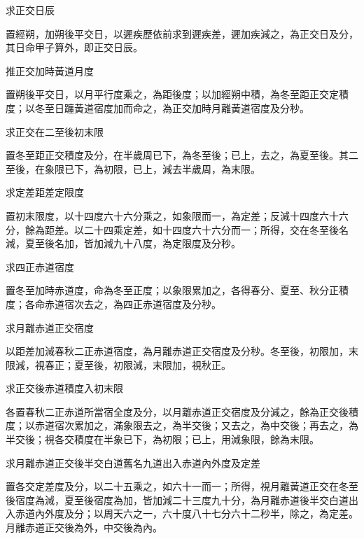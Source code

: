 \begin{pinyinscope}
 求正交日辰



 置經朔，加朔後平交日，以遲疾歷依前求到遲疾差，遲加疾減之，為正交日及分，其日命甲子算外，即正交日辰。



 推正交加時黃道月度



 置朔後平交日，以月平行度乘之，為距後度；以加經朔中積，為冬至距正交定積度；以冬至日躔黃道宿度加而命之，為正交加時月離黃道宿度及分秒。



 求正交在二至後初末限



 置冬至距正交積度及分，在半歲周已下，為冬至後；已上，去之，為夏至後。其二至後，在象限已下，為初限，已上，減去半歲周，為末限。



 求定差距差定限度



 置初末限度，以十四度六十六分乘之，如象限而一，為定差；反減十四度六十六分，餘為距差。以二十四乘定差，如十四度六十六分而一；所得，交在冬至後名減，夏至後名加，皆加減九十八度，為定限度及分秒。



 求四正赤道宿度



 置冬至加時赤道度，命為冬至正度；以象限累加之，各得春分、夏至、秋分正積度；各命赤道宿次去之，為四正赤道宿度及分秒。



 求月離赤道正交宿度



 以距差加減春秋二正赤道宿度，為月離赤道正交宿度及分秒。冬至後，初限加，末限減，視春正；夏至後，初限減，末限加，視秋正。



 求正交後赤道積度入初末限



 各置春秋二正赤道所當宿全度及分，以月離赤道正交宿度及分減之，餘為正交後積度；以赤道宿次累加之，滿象限去之，為半交後；又去之，為中交後；再去之，為半交後；視各交積度在半象已下，為初限；已上，用減象限，餘為末限。



 求月離赤道正交後半交白道舊名九道出入赤道內外度及定差



 置各交定差度及分，以二十五乘之，如六十一而一；所得，視月離黃道正交在冬至後宿度為減，夏至後宿度為加，皆加減二十三度九十分，為月離赤道後半交白道出入赤道內外度及分；以周天六之一，六十度八十七分六十二秒半，除之，為定差。月離赤道正交後為外，中交後為內。




\end{pinyinscope}
